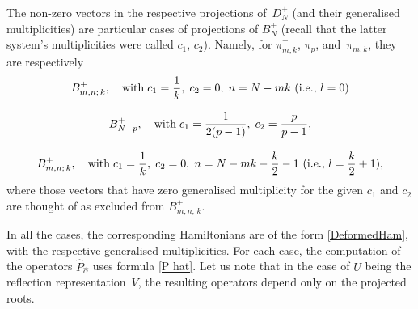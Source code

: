 \documentclass[12pt]{amsart}
\numberwithin{equation}{section}
\theoremstyle{definition}
\begin{document}
The non-zero vectors in the respective projections of~$D_N^+$ (and their generalised multiplicities)
are particular cases of projections of $B_N^+$ (recall that the latter system's multiplicities were called $c_1$, $c_2$). Namely, for $\pi_{m,k}^{+}$, $\pi_p$, and~$\pi_{m,k}$, they are respectively
\begin{equation*}
    \begin{array}{c}
    \displaystyle{
    B_{m,n; \, k}^+, \quad {\rm with} \; c_1 = \frac{1}{k}, \; c_2 = 0, \; n = N - mk \ (\text{i.e., } l=0)
    }
    \\ \ \\
    \displaystyle{
    B^{+}_{N - p}, \quad {\rm with} \; c_1 = \frac{1}{2(p-1)}, \; c_2 = \frac{p}{p-1},
    }
    \\ \ \\
    \displaystyle{
    B_{m,n; \, k}^+, \quad {\rm with} \; c_1 = \frac{1}{k}, \; c_2 = 0, \; n = N - mk -\frac{k}{2}-1 \ (\text{i.e., } l=\frac{k}{2}+1),
    }
    \end{array}
\end{equation*}
where those vectors that have zero generalised multiplicity for the given $c_1$ and $c_2$ are thought of as excluded from $B_{m,n; \, k}^+$.

In all the cases, the corresponding Hamiltonians are of the form \eqref{DeformedHam}, with the respective generalised multiplicities. For each case, the computation of the operators $\widehat{P}_{\widehat{\alpha}}$ uses formula \eqref{P hat}. Let us note that in the case of $U$ being the reflection representation~$V$, the resulting operators depend only on the projected roots.
\end{document}
